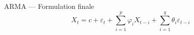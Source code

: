 \begin{frame}{ARMA --- Formulation finale}
  \[
  X_{t}=c +\varepsilon _{t}+\sum _{i=1}^{p}\varphi _{i}X_{t-i}+\sum _{i=1}^{q}\theta _{i}\varepsilon _{t-i}
  \]
\end{frame}





